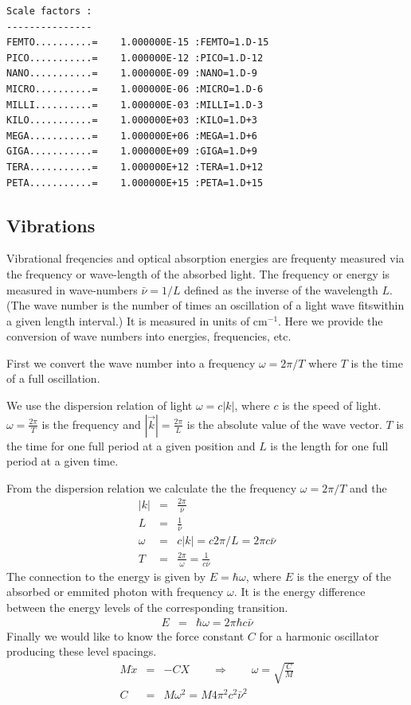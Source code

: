 \documentclass[final,12pt]{article}
\begin{document}
{{{{{{\begin{verbatim}
Scale factors :
---------------
FEMTO..........=    1.000000E-15 :FEMTO=1.D-15
PICO...........=    1.000000E-12 :PICO=1.D-12
NANO...........=    1.000000E-09 :NANO=1.D-9
MICRO..........=    1.000000E-06 :MICRO=1.D-6
MILLI..........=    1.000000E-03 :MILLI=1.D-3
KILO...........=    1.000000E+03 :KILO=1.D+3
MEGA...........=    1.000000E+06 :MEGA=1.D+6
GIGA...........=    1.000000E+09 :GIGA=1.D+9
TERA...........=    1.000000E+12 :TERA=1.D+12
PETA...........=    1.000000E+15 :PETA=1.D+15
\end{verbatim}

\newpage
\subsection{Vibrations}

Vibrational freqencies and optical absorption energies are frequenty measured
via the frequency or wave-length of the absorbed light. The frequency or
energy is measured in wave-numbers $\bar{\nu}=1/L$ defined as the inverse
of the wavelength $L$. (The wave number is the number of times an
oscillation of a light wave fitswithin a given length interval.) It is
measured in units of cm$^{-1}$. Here we provide the conversion of wave numbers
into energies, frequencies, etc.


First we convert the wave number into a frequency $\omega=2\pi/T$ where $T$ is
the time of a full oscillation. 

We use the dispersion relation of light $\omega=c|k|$, where $c$ is the speed
of light. $\omega=\frac{2\pi}{T}$ is the frequency and
$|\vec{k}|=\frac{2\pi}{L}$ is the absolute value of the wave vector. $T$ is the
time for one full period at a given position and $L$ is the length for one
full period at a given time.

From the dispersion relation we calculate the 
the frequency $\omega=2\pi/T$ and the 
\begin{eqnarray}
|k|&=&\frac{2\pi}{\bar{\nu}}
\label{eq:kofbarnu}
\\
L&=&\frac{1}{\bar{\nu}}
\label{eq:wavelengthofbarnu}
\\
\omega&=&c|k|=c2\pi/L=2\pi c\bar{\nu}
\label{eq:omegaofbarnu}
\\
T&=&\frac{2\pi}{\omega}=\frac{1}{c\bar{\nu}}
\label{eq:periodofbarnu}
\end{eqnarray}
The connection to the energy is given by $E=\hbar\omega$, where $E$ is the
energy of the absorbed or emmited photon with frequency $\omega$. It is the
energy difference between the energy levels of the corresponding transition.
\begin{eqnarray}
E&=&\hbar\omega=2\pi\hbar c\bar{\nu}
\label{eq:eofomega}
\end{eqnarray}
Finally we would like to know the force constant $C$ for a harmonic oscillator
producing these level spacings. 
\begin{eqnarray}
M\ddot{x}&=&-CX
\qquad\Rightarrow\qquad \omega= \sqrt{\frac{C}{M}}
\nonumber\\
C&=&M\omega^2=M4\pi^2c^2\bar{\nu}^2
\end{eqnarray}

}}}}}}
\end{document}
